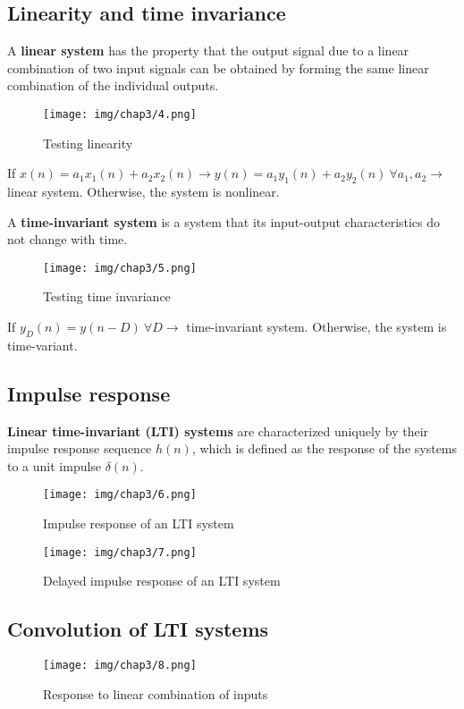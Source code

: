 \subsection{Linearity and time invariance}
A \textbf{linear system} has the property that the output signal due to a linear combination of two input signals can be obtained by forming the same linear combination of the individual outputs.
\begin{figure}[h!]
    \centering
    \texttt{[image: img/chap3/4.png]}
    \caption{Testing linearity}
\end{figure}

If $x(n)=a_1x_1(n)+a_2x_2(n) \to y(n)=a_1y_1(n)+a_2y_2(n) \ \forall a_1,a_2 \to$ linear system. Otherwise, the system is nonlinear.

A \textbf{time-invariant system} is a system that its input-output characteristics do not change with time.
\begin{figure}[h!]
    \centering
    \texttt{[image: img/chap3/5.png]}
    \caption{Testing time invariance}
\end{figure}

If $y_D(n)=y(n-D) \ \forall D \to$ time-invariant system. Otherwise, the system is time-variant.
\subsection{Impulse response}
\textbf{Linear time-invariant (LTI) systems} are characterized uniquely by their impulse response sequence $h(n)$, which is defined as the response of the systems to a unit impulse $\delta(n)$.
\begin{figure}[h!]
    \centering
    \texttt{[image: img/chap3/6.png]}
    \caption{Impulse response of an LTI system}
\end{figure}
\begin{figure}[h!]
    \centering
    \texttt{[image: img/chap3/7.png]}
    \caption{Delayed impulse response of an LTI system}
\end{figure}
\subsection{Convolution of LTI systems}
\begin{figure}[h!]
    \centering
    \texttt{[image: img/chap3/8.png]}
    \caption{Response to linear combination of inputs}
\end{figure}

